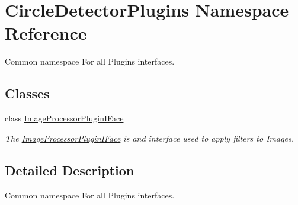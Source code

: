 \hypertarget{namespace_circle_detector_plugins}{}\section{Circle\+Detector\+Plugins Namespace Reference}
\label{namespace_circle_detector_plugins}


Common namespace For all Plugins interfaces.  


\subsection*{Classes}
\begin{DoxyCompactItemize}
\item 
class \hyperlink{class_circle_detector_plugins_1_1_image_processor_plugin_i_face}{Image\+Processor\+Plugin\+I\+Face}
\begin{DoxyCompactList}\small\item\em The \hyperlink{class_circle_detector_plugins_1_1_image_processor_plugin_i_face}{Image\+Processor\+Plugin\+I\+Face} is and interface used to apply filters to Images. \end{DoxyCompactList}\end{DoxyCompactItemize}


\subsection{Detailed Description}
Common namespace For all Plugins interfaces. 

